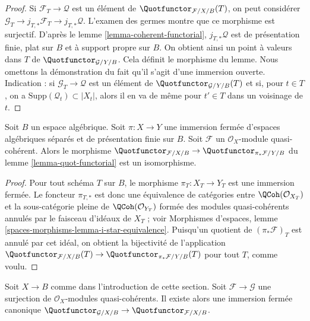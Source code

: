 \begin{proof}
Si $\mathcal{F}_T \to \mathcal{Q}$ est un élément de
$\Quotfunctor_{\mathcal{F}/X/B}(T)$, on peut considérer
$\mathcal{G}_T \to j_{T, *}\mathcal{F}_T \to j_{T, *}\mathcal{Q}$.
L'examen des germes montre que ce morphisme est surjectif.
D'après le lemme \ref{lemma-coherent-functorial},
$j_{T, *}\mathcal{Q}$ est de présentation finie, plat sur $B$ et à support
propre sur $B$. On obtient ainsi un point à valeurs dans $T$ de
$\Quotfunctor_{\mathcal{G}/Y/B}$. Cela définit le morphisme du lemme.
Nous omettons la démonstration du fait qu'il s'agit d'une immersion ouverte.
Indication : si $\mathcal{G}_T \to \mathcal{Q}$ est un élément de
$\Quotfunctor_{\mathcal{G}/Y/B}(T)$ et si, pour $t \in T$, on a
$\text{Supp}(\mathcal{Q}_t) \subset |X_t|$, alors il en va de même pour
$t' \in T$ dans un voisinage de $t$.
\end{proof}

\begin{lemma}
\label{lemma-quot-closed}
Soit $B$ un espace algébrique. Soit $\pi : X \to Y$ une immersion fermée
d'espaces algébriques séparés et de présentation finie sur $B$.
Soit $\mathcal{F}$ un $\mathcal{O}_X$-module quasi-cohérent.
Alors le morphisme
$\Quotfunctor_{\mathcal{F}/X/B} \to
\Quotfunctor_{\pi_*\mathcal{F}/Y/B}$ du lemme
\ref{lemma-quot-functorial} est un isomorphisme.
\end{lemma}

\begin{proof}
Pour tout schéma $T$ sur $B$, le morphisme $\pi_T : X_T \to Y_T$ est une
immersion fermée. Le foncteur $\pi_{T, *}$ est donc une équivalence de
catégories entre $\QCoh(\mathcal{O}_{X_T})$ et la sous-catégorie pleine de
$\QCoh(\mathcal{O}_{Y_T})$ formée des modules quasi-cohérents annulés par
le faisceau d'idéaux de $X_T$ ; voir Morphismes d'espaces, lemme
\ref{spaces-morphisms-lemma-i-star-equivalence}.
Puisqu'un quotient de $(\pi_*\mathcal{F})_T$ est annulé par cet idéal, on
obtient la bijectivité de l'application
$\Quotfunctor_{\mathcal{F}/X/B}(T) \to
\Quotfunctor_{\pi_*\mathcal{F}/Y/B}(T)$
pour tout $T$, comme voulu.
\end{proof}

\begin{lemma}
\label{lemma-quot-quotient}
Soit $X \to B$ comme dans l'introduction de cette section. Soit
$\mathcal{F} \to \mathcal{G}$ une surjection de $\mathcal{O}_X$-modules
quasi-cohérents. Il existe alors une immersion fermée canonique
$\Quotfunctor_{\mathcal{G}/X/B} \to
\Quotfunctor_{\mathcal{F}/X/B}$.
\end{lemma}

